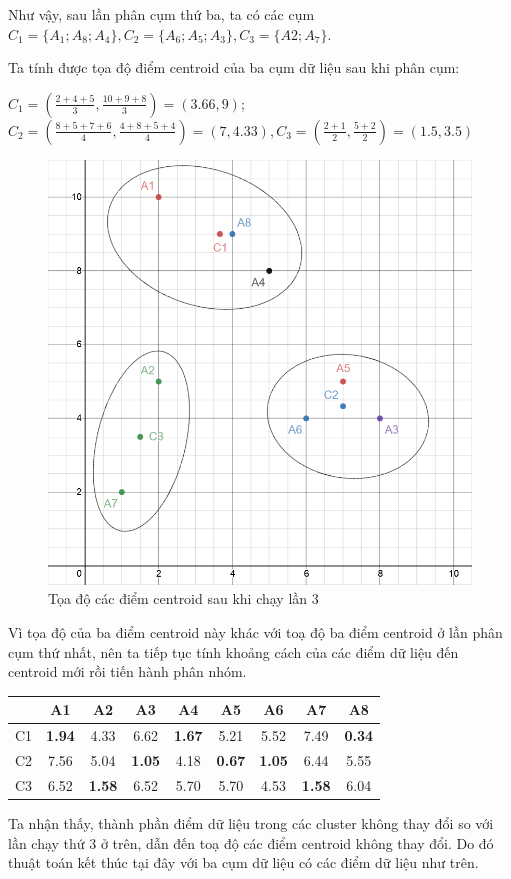 \documentclass{article}
\begin{document}
	Như vậy, sau lần phân cụm thứ ba, ta có các cụm $C_1 = \{A_1; A_8; A_4\}, C_2 = \{A_6; A_5; A_3\}, C_3 = \{A2; A_7\}$.\par
	\newpage
	Ta tính được tọa độ điểm centroid của ba cụm dữ liệu sau khi phân cụm:\par
	\medskip
	$C_1 = \left(\frac{2+4+5}{3}, \frac{10+9+8}{3}\right) = (3.66, 9)$; $C_2 = \left(\frac{8+5+7+6}{4}, \frac{4+8+5+4}{4}\right) = (7,4.33), C_3 = \left(\frac{2+1}{2}, \frac{5+2}{2}\right) = (1.5, 3.5)$\par
	\begin{figure}[h]
		\centering
		\includegraphics[width=0.6\linewidth]{img/ex_7}
		\caption{Tọa độ các điểm centroid sau khi chạy lần 3}
	\end{figure}\par
	Vì tọa độ của ba điểm centroid này khác với toạ độ ba điểm centroid ở lần phân cụm thứ nhất, nên ta tiếp tục tính khoảng cách của các điểm dữ liệu đến centroid mới rồi tiến hành phân nhóm.
	\begin{table}[h]
		\centering
		\begin{tabular}{|c|c|c|c|c|c|c|c|c|}
		\hline
		& A1 & A2 & A3 & A4 & A5 & A6 & A7 & A8 \\
		\hline
		C1 & \textbf{1.94} & 4.33 & 6.62 & \textbf{1.67} & 5.21 & 5.52 & 7.49 & \textbf{0.34} \\
		\hline
		C2 & 7.56 & 5.04 & \textbf{1.05} & 4.18 & \textbf{0.67} & \textbf{1.05} & 6.44 & 5.55 \\
		\hline
		C3 & 6.52 & \textbf{1.58} & 6.52 & 5.70 & 5.70 & 4.53 & \textbf{1.58} & 6.04 \\
		\hline
		\end{tabular}
	\end{table}\par
	Ta nhận thấy, thành phần điểm dữ liệu trong các cluster không thay đổi so với lần chạy thứ 3 ở trên, dẫn đến toạ độ các điểm centroid không thay đổi. Do đó thuật toán kết thúc tại đây với ba cụm dữ liệu có các điểm dữ liệu như trên.
	\newpage
\end{document}
